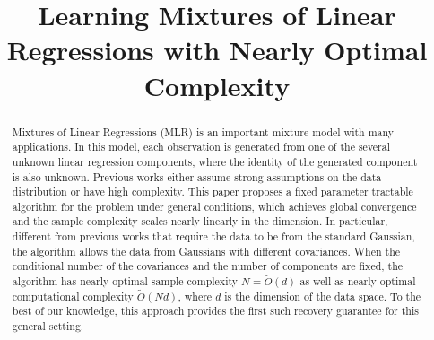 \documentclass[final,12pt]{colt2018}
\title{Learning Mixtures of Linear Regressions with Nearly Optimal Complexity}
\begin{document}
\maketitle


\begin{abstract}
Mixtures of Linear Regressions (MLR) is an important mixture model with many applications. In this model, each observation is generated from one of the several unknown linear regression components, where the identity of the generated component is also unknown. Previous works either assume strong assumptions on the data distribution or have high complexity. This paper proposes a fixed parameter tractable algorithm for the problem under general conditions, which achieves global convergence and the sample complexity scales nearly linearly in the dimension. In particular, different from previous works that require the data to be from the standard Gaussian, the algorithm allows the data from Gaussians with different covariances. When the conditional number of the covariances and the number of components are fixed, the algorithm has nearly optimal sample complexity $N = \tilde{O}(d)$ as well as nearly optimal computational complexity $\tilde{O}(Nd)$, where $d$ is the dimension of the data space. To the best of our knowledge, this approach provides the first such recovery guarantee for this general setting.
\end{abstract}

















\appendix

\end{document}
